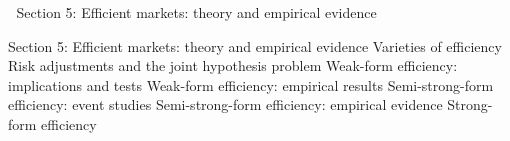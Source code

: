 

Section 5:  Efficient markets: theory and empirical evidence

Section 5:  Efficient markets: theory and empirical evidence
Varieties of efficiency
Risk adjustments and the joint hypothesis problem 
Weak-form efficiency: implications and tests 
Weak-form efficiency: empirical results
Semi-strong-form efficiency: event studies 
Semi-strong-form efficiency: empirical evidence 
Strong-form efficiency 


